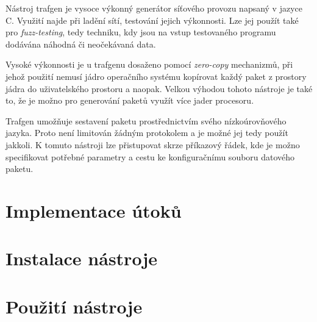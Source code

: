 Nástroj trafgen je vysoce výkonný generátor síťového provozu napsaný v jazyce C. Využití najde při ladění sítí, testování jejich výkonnosti. Lze jej použít také pro \textit{fuzz-testing}, tedy techniku, kdy jsou na vstup testovaného programu dodávána náhodná či neočekávaná data.

Vysoké výkonnosti je u trafgenu dosaženo pomocí \textit{zero-copy} mechanizmů, při jehož použití nemusí jádro operačního systému kopírovat každý paket z prostory jádra do uživatelského prostoru a naopak. Velkou výhodou tohoto nástroje je také to, že je možno pro generování paketů využít více jader procesoru.

Trafgen umožňuje sestavení paketu prostřednictvím svého nízkoúrovňového jazyka. Proto není limitován žádným protokolem a je možné jej tedy použít jakkoli. K tomuto nástroji lze přistupovat skrze příkazový řádek, kde je možno specifikovat potřebné parametry a cestu ke konfiguračnímu souboru datového paketu.





\section{Implementace útoků}


\section{Instalace nástroje}


\section{Použití nástroje}
